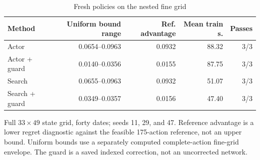 \begin{table}[htbp]
\centering\small\setlength{\tabcolsep}{4pt}
\caption{Fresh policies on the nested fine grid}\label{tab:r9nested}
\begin{tabular}{lrrrr}
\toprule
Method & Uniform bound range & Ref. advantage & Mean train s. & Passes \\
\midrule
Actor & 0.0654--0.0963 & 0.0932 & 88.32 & 3/3 \\
Actor + guard & 0.0140--0.0356 & 0.0155 & 87.75 & 3/3 \\
Search & 0.0655--0.0963 & 0.0932 & 51.07 & 3/3 \\
Search + guard & 0.0349--0.0357 & 0.0156 & 47.40 & 3/3 \\
\bottomrule
\end{tabular}
\par\vspace{3pt}\begin{minipage}{0.97\linewidth}\footnotesize Full $33\times49$ state grid, forty dates; seeds 11, 29, and 47. Reference advantage is a lower regret diagnostic against the feasible 175-action reference, not an upper bound. Uniform bounds use a separately computed complete-action fine-grid envelope. The guard is a saved indexed correction, not an uncorrected network.\end{minipage}
\end{table}
